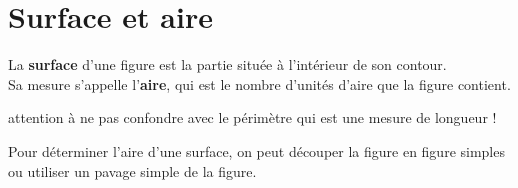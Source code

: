 \cours 

\section{Surface et aire}

\begin{definition}
   La \textbf{surface} d'une figure est la partie située à l'intérieur de son contour. \\
   Sa mesure s'appelle l'\textbf{aire}, qui est le nombre d'unités d'aire que la figure contient.
\end{definition}

\begin{remarque}
   attention à ne pas confondre avec le périmètre qui est une mesure de longueur !
\end{remarque}

Pour déterminer l'aire d'une surface, on peut découper la figure en figure simples ou utiliser un pavage simple de la figure.


